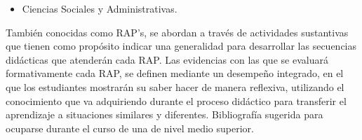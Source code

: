\begin{bGlosario}
\begin{itemize}
	\item Ciencias Sociales y Administrativas.
	\end{itemize}
 	 También conocidas como RAP's, se abordan a través de actividades sustantivas que tienen como
	propósito indicar una generalidad para desarrollar las secuencias didácticas que atenderán cada RAP.
	Las evidencias con las que se evaluará formativamente cada RAP, se definen mediante un desempeño integrado, en el que
	los estudiantes mostrarán su saber hacer de manera reflexiva, utilizando el conocimiento que va adquiriendo durante el proceso
	didáctico para transferir el aprendizaje a situaciones similares y diferentes.
 	 Bibliografía sugerida para ocuparse durante el curso de una  de nivel
	medio superior.


\end{bGlosario}
